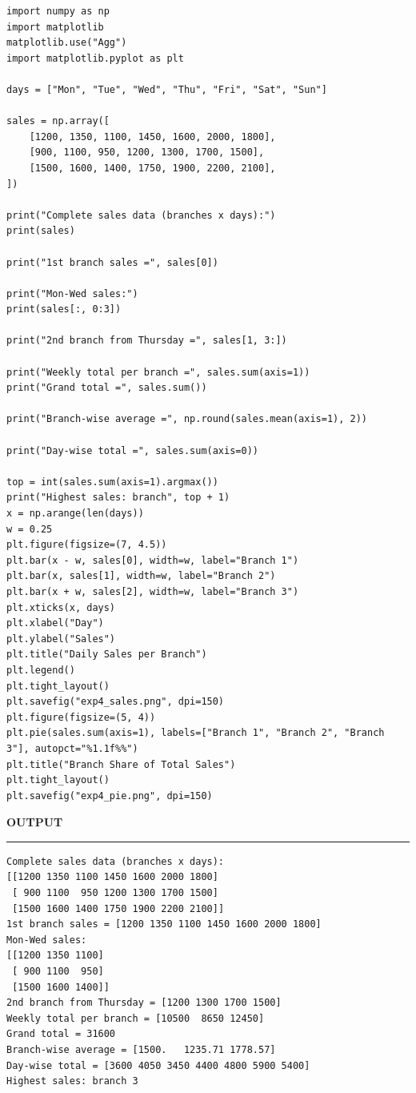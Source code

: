 \documentclass[11pt,twoside]{article}
\newcommand{\expheading}[1]{{\fontsize{14}{17}\selectfont\textbf{#1}\par}}
\newcommand{\tooddpage}{\clearpage\ifodd\value{page}\else\null\thispagestyle{empty}\newpage\fi}
\begin{document}
\begin{lstlisting}
import numpy as np
import matplotlib
matplotlib.use("Agg")
import matplotlib.pyplot as plt

days = ["Mon", "Tue", "Wed", "Thu", "Fri", "Sat", "Sun"]

sales = np.array([
    [1200, 1350, 1100, 1450, 1600, 2000, 1800],
    [900, 1100, 950, 1200, 1300, 1700, 1500],
    [1500, 1600, 1400, 1750, 1900, 2200, 2100],
])

print("Complete sales data (branches x days):")
print(sales)

print("1st branch sales =", sales[0])

print("Mon-Wed sales:")
print(sales[:, 0:3])

print("2nd branch from Thursday =", sales[1, 3:])

print("Weekly total per branch =", sales.sum(axis=1))
print("Grand total =", sales.sum())

print("Branch-wise average =", np.round(sales.mean(axis=1), 2))

print("Day-wise total =", sales.sum(axis=0))

top = int(sales.sum(axis=1).argmax())
print("Highest sales: branch", top + 1)
x = np.arange(len(days))
w = 0.25
plt.figure(figsize=(7, 4.5))
plt.bar(x - w, sales[0], width=w, label="Branch 1")
plt.bar(x, sales[1], width=w, label="Branch 2")
plt.bar(x + w, sales[2], width=w, label="Branch 3")
plt.xticks(x, days)
plt.xlabel("Day")
plt.ylabel("Sales")
plt.title("Daily Sales per Branch")
plt.legend()
plt.tight_layout()
plt.savefig("exp4_sales.png", dpi=150)
plt.figure(figsize=(5, 4))
plt.pie(sales.sum(axis=1), labels=["Branch 1", "Branch 2", "Branch 3"], autopct="%1.1f%%")
plt.title("Branch Share of Total Sales")
plt.tight_layout()
plt.savefig("exp4_pie.png", dpi=150)
\end{lstlisting}

\tooddpage
\expheading{OUTPUT}
\vspace{2pt}
\noindent\rule{\textwidth}{0.5pt}\par
\vspace{4pt}
\begin{verbatim}
Complete sales data (branches x days):
[[1200 1350 1100 1450 1600 2000 1800]
 [ 900 1100  950 1200 1300 1700 1500]
 [1500 1600 1400 1750 1900 2200 2100]]
1st branch sales = [1200 1350 1100 1450 1600 2000 1800]
Mon-Wed sales:
[[1200 1350 1100]
 [ 900 1100  950]
 [1500 1600 1400]]
2nd branch from Thursday = [1200 1300 1700 1500]
Weekly total per branch = [10500  8650 12450]
Grand total = 31600
Branch-wise average = [1500.   1235.71 1778.57]
Day-wise total = [3600 4050 3450 4400 4800 5900 5400]
Highest sales: branch 3
\end{verbatim}
\vspace{4pt}
\end{document}
